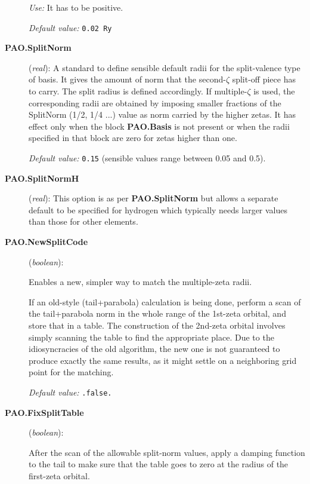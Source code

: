 \documentclass[11pt]{article}
\begin{document}
\begin{description}
{\it Use:} It has to be positive.

{\it Default value:} {\tt 0.02 Ry}


\item[{\bf PAO.SplitNorm}] ({\it real}): 
A standard to define sensible default
radii for the split-valence type of basis. It gives the amount of norm that
the second-$\zeta$ split-off piece has to carry. The split radius is defined
accordingly. If multiple-$\zeta$ 
is used, the corresponding radii are obtained
by imposing smaller fractions of the SplitNorm (1/2, 1/4 ...) value as
norm carried by the higher zetas. It has effect only when the block
{\bf PAO.Basis} is not present or when the radii
specified in that block are zero for zetas higher than one.

{\it Default value:} {\tt 0.15} (sensible values range between 0.05 and 0.5).

\item[{\bf PAO.SplitNormH}] ({\it real}):
This option is as per {\bf PAO.SplitNorm} but allows a separate
default to be
specified for hydrogen which typically needs larger values than those
for other
elements.

\item[{\bf PAO.NewSplitCode}] ({\it boolean}): 

Enables a new, simpler way to match the multiple-zeta radii.

If an old-style (tail+parabola) calculation is being done, perform a
scan of the tail+parabola norm in the whole range of the 1st-zeta
orbital, and store that in a table. The construction of the
2nd-zeta orbital involves simply scanning the table to find the
appropriate place. Due to the idiosyncracies of the old algorithm,
the new one is not guaranteed to produce exactly the same results,
as it might settle on a neighboring grid point for the matching.

{\it Default value:} {\tt .false.}

\item[{\bf PAO.FixSplitTable}] ({\it boolean}): 

After the scan of the allowable split-norm values, apply a damping
function to the tail to make sure that the table goes to zero at
the radius of the first-zeta orbital.


\end{description}
\end{document}
